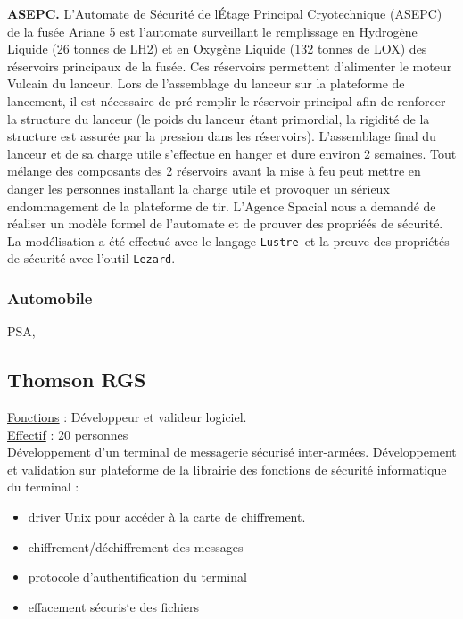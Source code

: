 \documentclass[a4paper,12pt]{article}
\newcommand{\Lustre}{{\tt Lustre}}
\newcommand{\Lezard}{{\tt Lezard}}
\newcommand{\smallspace}{\vspace{0.25cm}}
\begin{document}
\smallspace
\textbf{ASEPC.} L'Automate de S\'ecurit\'e de l\'Etage Principal
Cryotechnique (ASEPC) de la fus\'ee Ariane 5 est l'automate
surveillant le remplissage en Hydrog\`ene Liquide (26 tonnes de LH2)
et en Oxyg\`ene Liquide (132 tonnes de LOX) des r\'eservoirs
principaux de la fus\'ee. Ces r\'eservoirs permettent d'alimenter le
moteur Vulcain du lanceur.  Lors de l'assemblage du lanceur sur la
plateforme de lancement, il est n\'ecessaire de pr\'e-remplir le
r\'eservoir principal afin de renforcer la structure du lanceur (le
poids du lanceur \'etant primordial, la rigidit\'e de la structure est
assur\'ee par la pression dans les r\'eservoirs). L'assemblage final
du lanceur et de sa charge utile s'effectue en hanger et dure environ
2 semaines.  Tout m\'elange des composants des 2 r\'eservoirs avant la
mise à feu peut mettre en danger les personnes installant la charge
utile et provoquer un s\'erieux endommagement de la plateforme de
tir. L'Agence Spacial nous a demand\'e de r\'ealiser un mod\`ele
formel de l'automate et de prouver des propri\'e\'es de s\'ecurit\'e.
La mod\'elisation a \'et\'e effectu\'e avec le langage \Lustre\ et la
preuve des propri\'et\'es de s\'ecurit\'e avec l'outil \Lezard.

\subsubsection{Automobile}
PSA,

\begin{Block}
\subsection{Thomson RGS}
\hspace{-0.6cm}\underline{Fonctions} : D\'eveloppeur et valideur logiciel.
\\
\underline{Effectif} : 20 personnes
\\
D\'eveloppement d'un terminal de messagerie s\'ecuris\'e
inter-arm\'ees. D\'eveloppement et validation sur plateforme de la
librairie des fonctions de s\'ecurit\'e informatique du terminal :
\begin{itemize}
  \item driver Unix pour acc\'eder \`a la carte de chiffrement.
  \item chiffrement/d\'echiffrement des messages
  \item protocole d'authentification du terminal
  \item effacement s\'ecuris`e des fichiers
\end{itemize}
\end{Block}

\newpage


\end{document}
